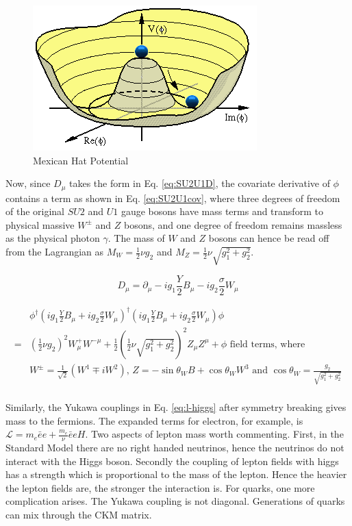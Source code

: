 \begin{figure}[htpb!]
\begin{center}
  \includegraphics[width=0.45\linewidth]{figures/theory/MexicanHat.png}
\caption{Mexican Hat Potential}
\label{fig:theory-mexican}
\end{center}
\end{figure}

Now, since $D_{\mu}$ takes the form in Eq. \ref{eq:SU2U1D}, the covariate derivative of $\phi$ contains a term as shown in Eq. \ref{eq:SU2U1cov}, where three degrees of freedom of the original $SU2$ and $U1$ gauge bosons have mass terms and transform to physical massive $W^{\pm}$ and $Z$ bosons, and one degree of freedom remains massless as the physical photon $\gamma$. The mass of $W$ and $Z$ bosons can hence be read off from the Lagrangian as $M_W = \frac{1}{2}\nu g_2$ and $M_Z = \frac{1}{2}\nu \sqrt{g_1^2+g_2^2}$.  

\begin{equation}
 D_{\mu}  = \partial_{\mu}-ig_1\frac{Y}{2}B_{\mu} - ig_2\frac{\sigma}{2}W_{\mu}
  \label{eq:SU2U1D}
\end{equation}

\begin{equation}
  \begin{split}
   &\phi^{\dagger}(ig_1\frac{Y}{2}B_{\mu}+ig_2\frac{\sigma}{2}W_{\mu})^{\dagger} (ig_1\frac{Y}{2}B_{\mu}+ig_2\frac{\sigma}{2}W_{\mu})\phi \\
   =& (\frac{1}{2}\nu g_2)^2 W_{\mu}^+W^{-\mu} + \frac{1}{2}(\frac{1}{2}\nu \sqrt{g_1^2+g_2^2})^2 Z_{\mu}Z^{\mu} + \text{$\phi$ field terms, where}\\
   &W^{\pm} = \frac{1}{\sqrt{2}}(W^1\mp iW^2) \text{, } Z = -\sin{\theta_W}B+\cos{\theta_W}W^3 \text{ and } \cos{\theta_W} = \frac{g_2}{\sqrt{g^2_1+g^2_2}}\\
  \end{split}
  \label{eq:SU2U1cov}
\end{equation}

Similarly, the Yukawa couplings in Eq. \ref{eq:l-higgs} after symmetry breaking gives mass to the fermions. The expanded terms for electron, for example, is $\mathcal{L} = m_e\bar{e} e + \frac{m_{e}}{\nu}\bar{e}e H$. Two aspects of lepton mass worth commenting. First, in the Standard Model there are no right handed neutrinos, hence the neutrinos do not interact with the Higgs boson. Secondly the coupling of lepton fields with higgs has a strength which is proportional to the mass of the lepton. Hence the heavier the lepton fields are, the stronger the interaction is. For quarks, one more complication arises. The Yukawa coupling is not diagonal. Generations of quarks can mix through the CKM matrix.

